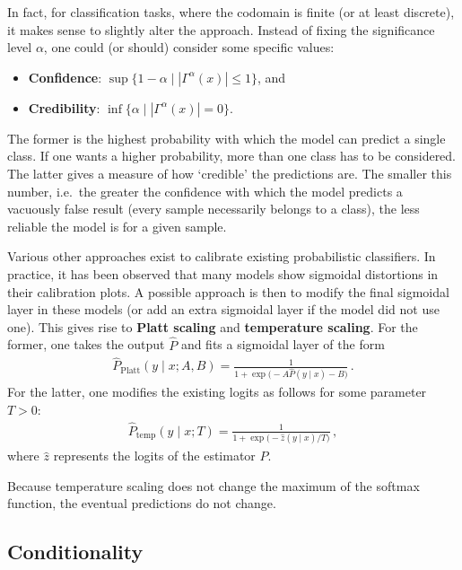     In fact, for classification tasks, where the codomain is finite (or at least discrete), it makes sense to slightly alter the approach. Instead of fixing the significance level $\alpha$, one could (or should) consider some specific values:
    \begin{itemize}
        \item\textbf{Confidence}: $\sup\{1-\alpha\mid|\Gamma^\alpha(x)|\leq1\}$, and
        \item\textbf{Credibility}: $\inf\{\alpha\mid|\Gamma^\alpha(x)|=0\}$.
    \end{itemize}
    The former is the highest probability with which the model can predict a single class. If one wants a higher probability, more than one class has to be considered. The latter gives a measure of how `credible' the predictions are. The smaller this number, i.e.~the greater the confidence with which the model predicts a vacuously false result (every sample necessarily belongs to a class), the less reliable the model is for a given sample.

    Various other approaches exist to calibrate existing probabilistic classifiers. In practice, it has been observed that many models show sigmoidal distortions in their calibration plots. A possible approach is then to modify the final sigmoidal layer in these models (or add an extra sigmoidal layer if the model did not use one). This gives rise to \textbf{Platt scaling} and \textbf{temperature scaling}. For the former, one takes the output $\widehat{P}$ and fits a sigmoidal layer of the form
    \begin{gather}
        \widehat{P}_{\text{Platt}}(y\mid x;A,B) = \frac{1}{1+\exp\bigl(-A\widehat{P}(y\mid x)-B\bigr)}\,.
    \end{gather}
    For the latter, one modifies the existing logits as follows for some parameter $T>0$:
    \begin{gather}
        \widehat{P}_{\text{temp}}(y\mid x;T) = \frac{1}{1+\exp\bigl(-\widehat{z}(y\mid x)/T\bigr)}\,,
    \end{gather}
    where $\widehat{z}$ represents the logits of the estimator $\widehat{P}$.

    \begin{remark}[Accuracy]
        Because temperature scaling does not change the maximum of the softmax function, the eventual predictions do not change.
    \end{remark}

\subsection{Conditionality}

